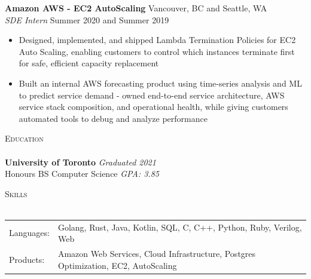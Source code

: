\documentclass[a4paper]{article}
\newcommand{\lineunder} {
    \vspace*{-8pt} \\
    \hspace*{-18pt} \hrulefill \\
}
\newcommand{\header} [1] {
    {\hspace*{-18pt}\vspace*{6pt} \textsc{#1}}
    \vspace*{-6pt} \lineunder
}
\begin{document}
\textbf{Amazon AWS - EC2 AutoScaling} \hfill Vancouver, BC and Seattle, WA\\
\textit{SDE Intern} \hfill Summer 2020 and Summer 2019\\
\vspace{-1mm}
\begin{itemize} \itemsep 1pt
    \item Designed, implemented, and shipped Lambda Termination Policies for EC2 Auto Scaling, enabling customers to control which instances terminate first for safe, efficient capacity replacement
    \item Built an internal AWS forecasting product using time-series analysis and ML to predict service demand - owned end-to-end service architecture, AWS service stack composition, and operational health, while giving customers automated tools to debug and analyze performance
\end{itemize}

\header{Education}
\textbf{University of Toronto} \hfill \textit{Graduated 2021}\\
Honours BS Computer Science \textit{GPA: 3.85}\\
\vspace{2mm}

\header{Skills}
\begin{tabular}{ l l }
	Languages: & Golang, Rust, Java, Kotlin, SQL, C, C++, Python, Ruby, Verilog, Web     \\
	Products:  & Amazon Web Services, Cloud Infrastructure, Postgres Optimization, EC2, AutoScaling \\
\end{tabular}
\vspace{2mm}
\end{document}
